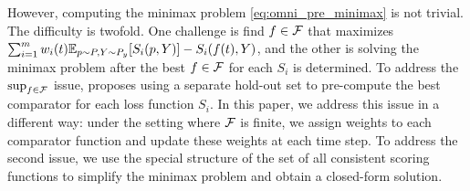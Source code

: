 However, computing the minimax problem \eqref{eq:omni_pre_minimax} is not trivial. The difficulty is twofold. One challenge is find $f \in \mathcal{F}$ that maximizes $\sum_{i=1}^m w_i(t) \mathbb{E}_{p \sim P, Y \sim P_y}[S_i(p, Y)] - S_i(f(t), Y)$, and the other is solving the minimax problem after the best $f \in \mathcal{F}$ for each $S_i$ is determined. To address the $\sup_{f \in \mathcal{F}}$ issue, \cite{isaac2025omni} proposes using a separate hold-out set to pre-compute the best comparator for each loss function $S_i$. In this paper, we address this issue in a different way: under the setting where $\mathcal{F}$ is finite, we assign weights to each comparator function and update these weights at each time step. To address the second issue, we use the special structure of the set of all consistent scoring functions to simplify the minimax problem and obtain a closed-form solution.




